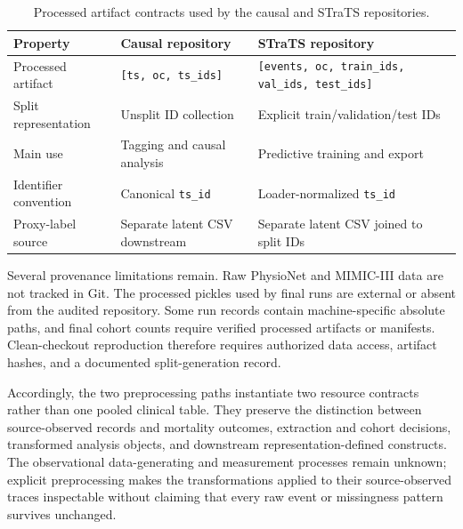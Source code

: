 \begin{table}[htbp]
\centering
\caption[Processed artifact contracts.]{Processed artifact contracts used by the causal and STraTS repositories.}
\label{tab:data-contracts}
\small
\begin{tabular}{L{0.20\textwidth}L{0.31\textwidth}L{0.39\textwidth}}
\toprule
Property & Causal repository & STraTS repository \\
\midrule
Processed artifact & \texttt{[ts, oc, ts\_ids]} & \texttt{[events, oc, train\_ids, val\_ids, test\_ids]} \\
Split representation & Unsplit ID collection & Explicit train/validation/test IDs \\
Main use & Tagging and causal analysis & Predictive training and export \\
Identifier convention & Canonical \texttt{ts\_id} & Loader-normalized \texttt{ts\_id} \\
Proxy-label source & Separate latent CSV downstream & Separate latent CSV joined to split IDs \\
\bottomrule
\end{tabular}
\end{table}

Several provenance limitations remain.  Raw PhysioNet and MIMIC-III data are not tracked in Git.  The processed pickles used by final runs are external or absent from the audited repository.  Some run records contain machine-specific absolute paths, and final cohort counts require verified processed artifacts or manifests.  Clean-checkout reproduction therefore requires authorized data access, artifact hashes, and a documented split-generation record.

Accordingly, the two preprocessing paths instantiate two resource contracts rather than one pooled clinical table.  They preserve the distinction between source-observed records and mortality outcomes, extraction and cohort decisions, transformed analysis objects, and downstream representation-defined constructs.  The observational data-generating and measurement processes remain unknown; explicit preprocessing makes the transformations applied to their source-observed traces inspectable without claiming that every raw event or missingness pattern survives unchanged.
